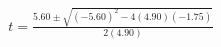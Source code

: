 \documentclass[preview]{standalone}
\begin{document}
\begin{align*}
t=\frac{5.60\pm\sqrt{(-5.60)^2-4(4.90)(-1.75)}}{2(4.90)}
\end{align*}
\end{document}
